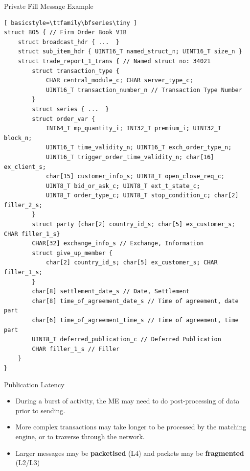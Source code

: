 \documentclass{beamer}
\begin{document}
\begin{frame}[fragile]{Private Fill Message Example}
\begin{lstlisting}[ basicstyle=\ttfamily\bfseries\tiny ]
struct BO5 { // Firm Order Book VIB
	struct broadcast_hdr { ...  }
	struct sub_item_hdr { UINT16_T named_struct_n; UINT16_T size_n }
	struct trade_report_1_trans { // Named struct no: 34021
		struct transaction_type {
			CHAR central_module_c; CHAR server_type_c;
			UINT16_T transaction_number_n // Transaction Type Number
		}
		struct series { ...  }
		struct order_var {
			INT64_T mp_quantity_i; INT32_T premium_i; UINT32_T block_n;
			UINT16_T time_validity_n; UINT16_T exch_order_type_n;
			UINT16_T trigger_order_time_validity_n; char[16] ex_client_s;
			char[15] customer_info_s; UINT8_T open_close_req_c;
			UINT8_T bid_or_ask_c; UINT8_T ext_t_state_c;
			UINT8_T order_type_c; UINT8_T stop_condition_c; char[2] filler_2_s;
		}
		struct party {char[2] country_id_s; char[5] ex_customer_s; CHAR filler_1_s}
		CHAR[32] exchange_info_s // Exchange, Information
		struct give_up_member {
			char[2] country_id_s; char[5] ex_customer_s; CHAR filler_1_s;
		}
		char[8] settlement_date_s // Date, Settlement
		char[8] time_of_agreement_date_s // Time of agreement, date part
		char[6] time_of_agreement_time_s // Time of agreement, time part
		UINT8_T deferred_publication_c // Deferred Publication
		CHAR filler_1_s // Filler
	}
}
\end{lstlisting}
\end{frame}


\begin{frame}{Publication Latency}
	\begin{itemize}{}
		\item During a burst of activity, the ME may need to do post-processing of data prior to sending.
		\item More complex transactions may take longer to be processed by the matching engine, or to traverse through the network.
		\item Larger messages may be \textbf{packetised} (L4) and packets may be \textbf{fragmented} (L2/L3)
	\end{itemize}
\end{frame}
\end{document}
